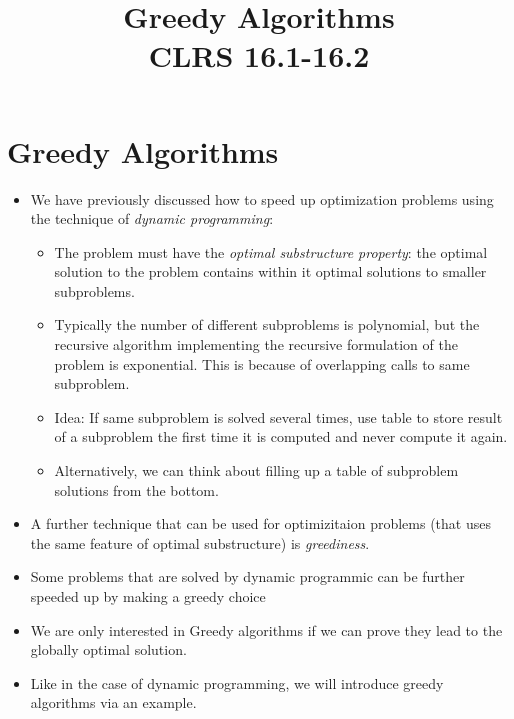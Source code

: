 \documentclass[11pt]{article}
\begin{document}
\title{{\bf Greedy Algorithms}\\ \normalsize{CLRS 16.1-16.2}}


\date{}

\maketitle



\section{Greedy Algorithms}
\begin{itemize}
\item We have previously discussed how to speed up optimization
problems using the technique of \emph{dynamic programming}:
  \begin{itemize}
  \item The problem must have the \emph{optimal substructure
    property}: the optimal solution to the problem contains within it
optimal solutions to smaller subproblems.
\item Typically the number of different subproblems is polynomial, but
the recursive algorithm implementing the recursive formulation of the
problem is exponential. This is because of overlapping calls to same
subproblem.
\item Idea: If same subproblem is solved several times, use table to
    store result of a subproblem the first time it is computed and
    never compute it again.
  \item Alternatively, we can think about filling up a table of
    subproblem solutions from the bottom.
  \end{itemize}

\item A further technique that can be used for optimizitaion problems
  (that uses the same feature of optimal substructure) is {\em
    greediness}.
\item Some problems that are solved by dynamic programmic can be
  further speeded up by making a greedy choice

\item We are only interested in Greedy algorithms if we can prove they
  lead to the globally optimal solution.

\item Like in the case of dynamic programming, we will introduce
greedy algorithms via an example.
\end{itemize}
\end{document}
